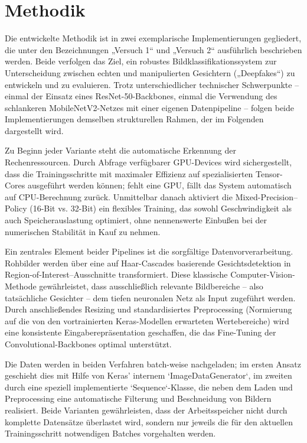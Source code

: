\chapter{Methodik}
\label{chap:methodik}

Die entwickelte Methodik ist in zwei exemplarische Implementierungen gegliedert, die unter den Bezeichnungen „Versuch 1“ und „Versuch 2“ ausführlich beschrieben werden. Beide verfolgen das Ziel, ein robustes Bildklassifikationssystem zur Unterscheidung zwischen echten und manipulierten Gesichtern („Deepfakes“) zu entwickeln und zu evaluieren. Trotz unterschiedlicher technischer Schwerpunkte – einmal der Einsatz eines ResNet-50-Backbones, einmal die Verwendung des schlankeren MobileNetV2-Netzes mit einer eigenen Datenpipeline – folgen beide Implementierungen demselben strukturellen Rahmen, der im Folgenden dargestellt wird.

Zu Beginn jeder Variante steht die automatische Erkennung der Rechenressourcen. Durch Abfrage verfügbarer GPU-Devices wird sichergestellt, dass die Trainingsschritte mit maximaler Effizienz auf spezialisierten Tensor-Cores ausgeführt werden können; fehlt eine GPU, fällt das System automatisch auf CPU-Berechnung zurück. Unmittelbar danach aktiviert die Mixed-Precision–Policy (16-Bit vs. 32-Bit) ein flexibles Training, das sowohl Geschwindigkeit als auch Speicherauslastung optimiert, ohne nennenswerte Einbußen bei der numerischen Stabilität in Kauf zu nehmen.

Ein zentrales Element beider Pipelines ist die sorgfältige Datenvorverarbeitung. Rohbilder werden über eine auf Haar-Cascades basierende Gesichtsdetektion in Region-of-Interest–Ausschnitte transformiert. Diese klassische Computer-Vision-Methode gewährleistet, dass ausschließlich relevante Bildbereiche – also tatsächliche Gesichter – dem tiefen neuronalen Netz als Input zugeführt werden. Durch anschließendes Resizing und standardisiertes Preprocessing (Normierung auf die von den vortrainierten Keras-Modellen erwarteten Wertebereiche) wird eine konsistente Eingaberepräsentation geschaffen, die das Fine-Tuning der Convolutional-Backbones optimal unterstützt.

Die Daten werden in beiden Verfahren batch-weise nachgeladen; im ersten Ansatz geschieht dies mit Hilfe von Keras’ internem `ImageDataGenerator`, im zweiten durch eine speziell implementierte `Sequence`-Klasse, die neben dem Laden und Preprocessing eine automatische Filterung und Beschneidung von Bildern realisiert. Beide Varianten gewährleisten, dass der Arbeitsspeicher nicht durch komplette Datensätze überlastet wird, sondern nur jeweils die für den aktuellen Trainingsschritt notwendigen Batches vorgehalten werden.

